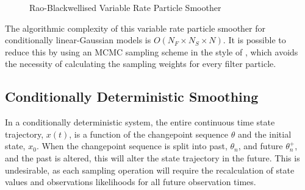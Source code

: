 \documentclass[journal]{IEEEtran}
\begin{document}
\begin{figure}
\caption{Rao-Blackwellised Variable Rate Particle Smoother}
\label{alg:RBVRPS}
\end{figure}

The algorithmic complexity of this variable rate particle smoother for conditionally linear-Gaussian models is $O(N_F \times N_S \times N)$. It is possible to reduce this by using an MCMC sampling scheme in the style of \cite{Bunch2012}, which avoids the necessity of calculating the sampling weights for every filter particle.



\subsection{Conditionally Deterministic Smoothing} \label{sec:pd-vrps}

In a conditionally deterministic system, the entire continuous time state trajectory, $x(t)$, is a function of the changepoint sequence $\theta$ and the initial state, $x_0$. When the changepoint sequence is split into past, $\theta_n$, and future $\theta_n^+$, and the past is altered, this will alter the state trajectory in the future. This is undesirable, as each sampling operation will require the recalculation of state values and observations likelihoods for all future observation times.
\end{document}
